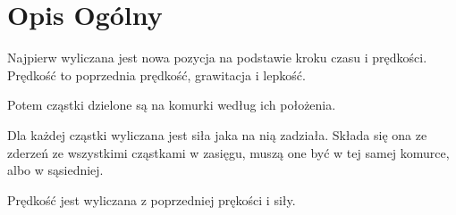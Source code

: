 \hypertarget{index_Opis_Ogólny}{}\section{Opis Ogólny}\label{index_Opis_Ogólny}

\begin{DoxyItemize}
\item Najpierw wyliczana jest nowa pozycja na podstawie kroku czasu i prędkości. Prędkość to poprzednia prędkość, grawitacja i lepkość.
\item Potem cząstki dzielone są na komurki według ich położenia.
\item Dla każdej cząstki wyliczana jest siła jaka na nią zadziała. Składa się ona ze zderzeń ze wszystkimi cząstkami w zasięgu, muszą one być w tej samej komurce, albo w sąsiedniej.
\item Prędkość jest wyliczana z poprzedniej prękości i siły. 
\end{DoxyItemize}